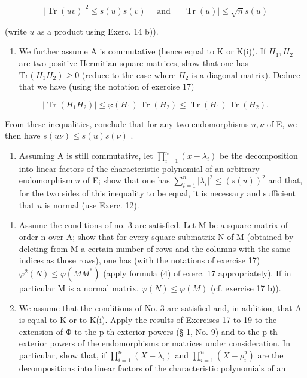 \[
\left| \operatorname{Tr} (u v) \right| ^ {2} \leqslant s (u) s (v) \quad \text { and } \quad \left| \operatorname{Tr} (u) \right| \leqslant \sqrt {n} s (u)
\]

(write \(u\) as a product using Exerc. 14 b)).

\begin{enumerate}
\def\labelenumi{\alph{enumi})}
\setcounter{enumi}{1}
\tightlist
\item
  We further assume A is commutative (hence equal to K or K(i)). If \(H_{1}, H_{2}\) are two positive Hermitian square matrices, show that one has \(\mathrm{Tr}(H_{1}H_{2}) \geqslant 0\) (reduce to the case where \(H_{2}\) is a diagonal matrix). Deduce that we have (using the notation of exercise 17)
\end{enumerate}

\[
\left| \operatorname{Tr} (H _ {1} H _ {2}) \right| \leqslant \varphi (H _ {1}) \operatorname{Tr} (H _ {2}) \leqslant \operatorname{Tr} (H _ {1}) \operatorname{Tr} (H _ {2}).
\]

From these inequalities, conclude that for any two endomorphisms \(u, \nu\) of E, we then have \(s(u\nu) \leqslant s(u)s(\nu)\) .

\begin{enumerate}
\def\labelenumi{\alph{enumi})}
\setcounter{enumi}{2}
\tightlist
\item
  Assuming A is still commutative, let \(\prod_{i=1}^{n}(x-\lambda_i)\) be the decomposition into linear factors of the characteristic polynomial of an arbitrary endomorphism \(u\) of E; show that one has \(\sum_{i=1}^{n}|\lambda_i|^2\leqslant(s(u))^2\) and that, for the two sides of this inequality to be equal, it is necessary and sufficient that \(u\) is normal (use Exerc. 12).
\end{enumerate}

\begin{enumerate}
\def\labelenumi{\arabic{enumi})}
\setcounter{enumi}{18}
\item
  Assume the conditions of no. 3 are satisfied. Let M be a square matrix of order n over A; show that for every square submatrix N of M (obtained by deleting from M a certain number of rows and the columns with the same indices as those rows), one has (with the notations of exercise 17) \(\varphi^{2}(N) \leqslant \varphi(MM^{*})\) (apply formula (4) of exerc. 17 appropriately). If in particular M is a normal matrix, \(\varphi(N) \leqslant \varphi(M)\) (cf. exercise 17 b)).
\item
  We assume that the conditions of No. 3 are satisfied and, in addition, that A is equal to K or to K(i). Apply the results of Exercises 17 to 19 to the extension of Φ to the p-th exterior powers (§ 1, No. 9) and to the p-th exterior powers of the endomorphisms or matrices under consideration. In particular, show that, if \(\prod_{i=1}^{n}(X-\lambda_i)\) and \(\prod_{i=1}^{n}(X-\rho_i^2)\) are the decompositions into linear factors of the characteristic polynomials of an
\end{enumerate}


